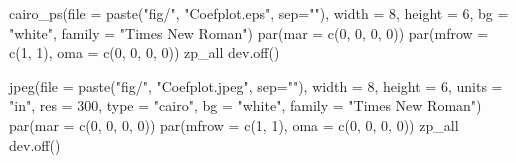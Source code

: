 \documentclass[
  letterpaper,
  DIV=11,
  numbers=noendperiod]{scrreprt}
\newenvironment{Shaded}{\begin{snugshade}}{\end{snugshade}}
\newcommand{\AttributeTok}[1]{\textcolor[rgb]{0.40,0.45,0.13}{#1}}
\newcommand{\DecValTok}[1]{\textcolor[rgb]{0.68,0.00,0.00}{#1}}
\newcommand{\FunctionTok}[1]{\textcolor[rgb]{0.28,0.35,0.67}{#1}}
\newcommand{\NormalTok}[1]{\textcolor[rgb]{0.00,0.23,0.31}{#1}}
\newcommand{\StringTok}[1]{\textcolor[rgb]{0.13,0.47,0.30}{#1}}
\begin{document}
\begin{Shaded}
\begin{Highlighting}[]
\FunctionTok{cairo\_ps}\NormalTok{(}\AttributeTok{file =} \FunctionTok{paste}\NormalTok{(}\StringTok{"fig/"}\NormalTok{, }\StringTok{"Coefplot.eps"}\NormalTok{, }\AttributeTok{sep=}\StringTok{""}\NormalTok{), }\AttributeTok{width =} \DecValTok{8}\NormalTok{, }\AttributeTok{height =} \DecValTok{6}\NormalTok{, }
          \AttributeTok{bg =} \StringTok{"white"}\NormalTok{, }\AttributeTok{family =} \StringTok{"Times New Roman"}\NormalTok{)}
\FunctionTok{par}\NormalTok{(}\AttributeTok{mar =} \FunctionTok{c}\NormalTok{(}\DecValTok{0}\NormalTok{, }\DecValTok{0}\NormalTok{, }\DecValTok{0}\NormalTok{, }\DecValTok{0}\NormalTok{))}
\FunctionTok{par}\NormalTok{(}\AttributeTok{mfrow =} \FunctionTok{c}\NormalTok{(}\DecValTok{1}\NormalTok{, }\DecValTok{1}\NormalTok{), }\AttributeTok{oma =} \FunctionTok{c}\NormalTok{(}\DecValTok{0}\NormalTok{, }\DecValTok{0}\NormalTok{, }\DecValTok{0}\NormalTok{, }\DecValTok{0}\NormalTok{))}
\NormalTok{zp\_all}
\FunctionTok{dev.off}\NormalTok{()}

\FunctionTok{jpeg}\NormalTok{(}\AttributeTok{file =} \FunctionTok{paste}\NormalTok{(}\StringTok{"fig/"}\NormalTok{, }\StringTok{"Coefplot.jpeg"}\NormalTok{, }\AttributeTok{sep=}\StringTok{""}\NormalTok{), }\AttributeTok{width =} \DecValTok{8}\NormalTok{, }\AttributeTok{height =} \DecValTok{6}\NormalTok{, }
    \AttributeTok{units =} \StringTok{"in"}\NormalTok{, }\AttributeTok{res =} \DecValTok{300}\NormalTok{, }\AttributeTok{type =} \StringTok{"cairo"}\NormalTok{,}
          \AttributeTok{bg =} \StringTok{"white"}\NormalTok{, }\AttributeTok{family =} \StringTok{"Times New Roman"}\NormalTok{)}
\FunctionTok{par}\NormalTok{(}\AttributeTok{mar =} \FunctionTok{c}\NormalTok{(}\DecValTok{0}\NormalTok{, }\DecValTok{0}\NormalTok{, }\DecValTok{0}\NormalTok{, }\DecValTok{0}\NormalTok{))}
\FunctionTok{par}\NormalTok{(}\AttributeTok{mfrow =} \FunctionTok{c}\NormalTok{(}\DecValTok{1}\NormalTok{, }\DecValTok{1}\NormalTok{), }\AttributeTok{oma =} \FunctionTok{c}\NormalTok{(}\DecValTok{0}\NormalTok{, }\DecValTok{0}\NormalTok{, }\DecValTok{0}\NormalTok{, }\DecValTok{0}\NormalTok{))}
\NormalTok{zp\_all}
\FunctionTok{dev.off}\NormalTok{()}
\end{Highlighting}
\end{Shaded}
\end{document}
